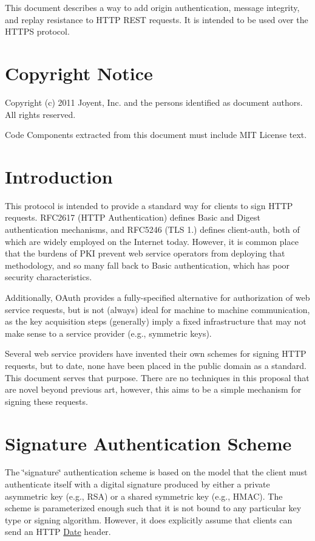 This document describes a way to add origin authentication, message integrity, and replay resistance to H\+T\+TP R\+E\+ST requests. It is intended to be used over the H\+T\+T\+PS protocol.

\section*{Copyright Notice}

Copyright (c) 2011 Joyent, Inc. and the persons identified as document authors. All rights reserved.

Code Components extracted from this document must include M\+IT License text.

\section*{Introduction}

This protocol is intended to provide a standard way for clients to sign H\+T\+TP requests. R\+F\+C2617 (H\+T\+TP Authentication) defines Basic and Digest authentication mechanisms, and R\+F\+C5246 (T\+LS 1.) defines client-\/auth, both of which are widely employed on the Internet today. However, it is common place that the burdens of P\+KI prevent web service operators from deploying that methodology, and so many fall back to Basic authentication, which has poor security characteristics.

Additionally, O\+Auth provides a fully-\/specified alternative for authorization of web service requests, but is not (always) ideal for machine to machine communication, as the key acquisition steps (generally) imply a fixed infrastructure that may not make sense to a service provider (e.\+g., symmetric keys).

Several web service providers have invented their own schemes for signing H\+T\+TP requests, but to date, none have been placed in the public domain as a standard. This document serves that purpose. There are no techniques in this proposal that are novel beyond previous art, however, this aims to be a simple mechanism for signing these requests.

\section*{Signature Authentication Scheme}

The \char`\"{}signature\char`\"{} authentication scheme is based on the model that the client must authenticate itself with a digital signature produced by either a private asymmetric key (e.\+g., R\+SA) or a shared symmetric key (e.\+g., H\+M\+AC). The scheme is parameterized enough such that it is not bound to any particular key type or signing algorithm. However, it does explicitly assume that clients can send an H\+T\+TP {\ttfamily \mbox{\hyperlink{classDate}{Date}}} header.

